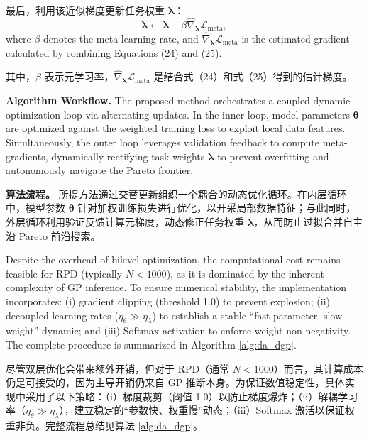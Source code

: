 \documentclass[11pt]{article}
\begin{document}
最后，利用该近似梯度更新任务权重 $\boldsymbol{\lambda}$：
\begin{equation}
	\boldsymbol{\lambda }\leftarrow \boldsymbol{\lambda }-\beta {{\hat{\nabla }}_{\boldsymbol{\lambda }}}{{\mathcal{L}}_{\text{meta}}},
\end{equation}
where $\beta$ denotes the meta-learning rate, and $\hat{\nabla}_{\boldsymbol{\lambda}} \mathcal{L}_{\text{meta}}$ is the estimated gradient calculated by combining Equations (24) and (25).

其中，$\beta$ 表示元学习率，$\hat{\nabla}_{\boldsymbol{\lambda}} \mathcal{L}_{\text{meta}}$ 是结合式（24）和式（25）得到的估计梯度。

\textbf{Algorithm Workflow.} The proposed method orchestrates a coupled dynamic optimization loop via alternating updates. In the inner loop, model parameters $\boldsymbol{\theta}$ are optimized against the weighted training loss to exploit local data features. Simultaneously, the outer loop leverages validation feedback to compute meta-gradients, dynamically rectifying task weights $\boldsymbol{\lambda}$ to prevent overfitting and autonomously navigate the Pareto frontier.

\textbf{算法流程。} 所提方法通过交替更新组织一个耦合的动态优化循环。在内层循环中，模型参数 $\boldsymbol{\theta}$ 针对加权训练损失进行优化，以开采局部数据特征；与此同时，外层循环利用验证反馈计算元梯度，动态修正任务权重 $\boldsymbol{\lambda}$，从而防止过拟合并自主沿 Pareto 前沿搜索。

Despite the overhead of bilevel optimization, the computational cost remains feasible for RPD (typically $N<1000$), as it is dominated by the inherent complexity of GP inference. To ensure numerical stability, the implementation incorporates: (i) gradient clipping (threshold 1.0) to prevent explosion; (ii) decoupled learning rates ($\eta_{\theta} \gg \eta_{\lambda}$) to establish a stable ``fast-parameter, slow-weight'' dynamic; and (iii) Softmax activation to enforce weight non-negativity. The complete procedure is summarized in Algorithm \ref{alg:da_dgp}.

尽管双层优化会带来额外开销，但对于 RPD（通常 $N<1000$）而言，其计算成本仍是可接受的，因为主导开销仍来自 GP 推断本身。为保证数值稳定性，具体实现中采用了以下策略：（i）梯度裁剪（阈值 1.0）以防止梯度爆炸；（ii）解耦学习率（$\eta_{\theta} \gg \eta_{\lambda}$），建立稳定的“参数快、权重慢”动态；（iii）Softmax 激活以保证权重非负。完整流程总结见算法 \ref{alg:da_dgp}。
\end{document}
